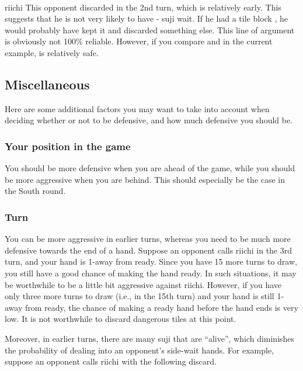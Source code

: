 {{\bp
\bei{}\fa{}\\
\hspace{107pt}\footnotesize{riichi}
\ep
This opponent discarded {\LARGE{}} in the 2nd turn, which is relatively early. This suggests that he is not very likely to have {\LARGE{}-} {\jap suji} wait. If he had a tile block {\LARGE{}}, he would probably have kept it and discarded something else. 
This line of argument is obviously not 100\% reliable. However, if you compare {\LARGE{}} and {\LARGE{}} in the current example, {\LARGE{}} is relatively safe. 

\subsection{Miscellaneous}
Here are some additional factors you may want to take into account when deciding whether or not to be defensive, and how much defensive you should be. 

\subsubsection*{Your position in the game}
You should be more defensive when you are ahead of the game, while you should be more aggressive when you are behind. This should especially be the case in the South round. 

\subsubsection*{Turn}
You can be more aggressive in earlier turns, whereas you need to be much more defensive towards the end of a hand. Suppose an opponent calls riichi in the 3rd turn, and your hand is 1-away from ready. Since you have 15 more turns to draw, you still have a good chance of making the hand ready. In such situations, it may be worthwhile to be a little bit aggressive against riichi. 
However, if you have only three more turns to draw (i.e., in the 15th turn) and your hand is still 1-away from ready, the chance of making a ready hand before the hand ends is very low. It is not worthwhile to discard dangerous tiles at this point. 

\bigskip
Moreover, in earlier turns, there are many {\jap suji} that are ``alive'', which diminishes the probability of dealing into an opponent's side-wait hands. For example, suppose an opponent calls riichi with the following discard. 

}}
